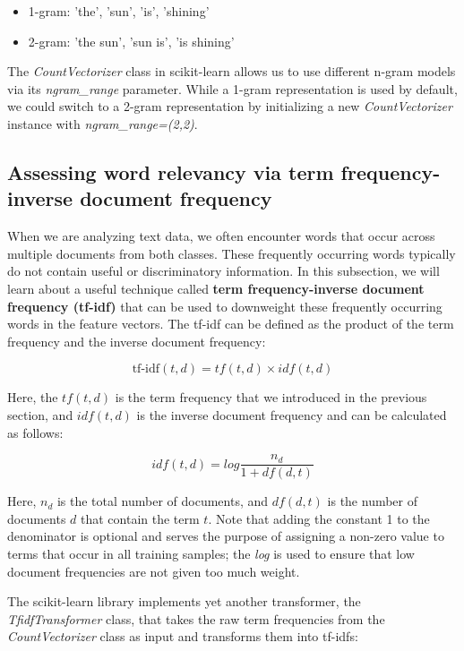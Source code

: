 \documentclass[11pt]{article}
\providecommand{\tightlist}{%
      \setlength{\itemsep}{0pt}\setlength{\parskip}{0pt}}
\begin{document}
\begin{itemize}
\tightlist
\item
  1-gram: 'the', 'sun', 'is', 'shining'
\item
  2-gram: 'the sun', 'sun is', 'is shining'
\end{itemize}

The \emph{CountVectorizer} class in scikit-learn allows us to use
different n-gram models via its \emph{ngram\_range} parameter. While a
1-gram representation is used by default, we could switch to a 2-gram
representation by initializing a new \emph{CountVectorizer} instance
with \emph{ngram\_range=(2,2)}.

    \subsection{Assessing word relevancy via term frequency-inverse document
frequency}\label{assessing-word-relevancy-via-term-frequency-inverse-document-frequency}

    When we are analyzing text data, we often encounter words that occur
across multiple documents from both classes. These frequently occurring
words typically do not contain useful or discriminatory information. In
this subsection, we will learn about a useful technique called
\textbf{term frequency-inverse document frequency (tf-idf)} that can be
used to downweight these frequently occurring words in the feature
vectors. The tf-idf can be defined as the product of the term frequency
and the inverse document frequency:

\[\text{tf-idf}(t,d) = tf(t,d) \times idf(t,d)\]

Here, the \(tf(t,d)\) is the term frequency that we introduced in the
previous section, and \(idf(t,d)\) is the inverse document frequency and
can be calculated as follows:

\[idf(t,d) = log\frac{n_d}{1+df(d,t)}\]

Here, \(n_d\) is the total number of documents, and \(df(d,t)\) is the
number of documents \(d\) that contain the term \(t\). Note that adding
the constant 1 to the denominator is optional and serves the purpose of
assigning a non-zero value to terms that occur in all training samples;
the \emph{log} is used to ensure that low document frequencies are not
given too much weight.

The scikit-learn library implements yet another transformer, the
\emph{TfidfTransformer} class, that takes the raw term frequencies from
the \emph{CountVectorizer} class as input and transforms them into
tf-idfs:
\end{document}
